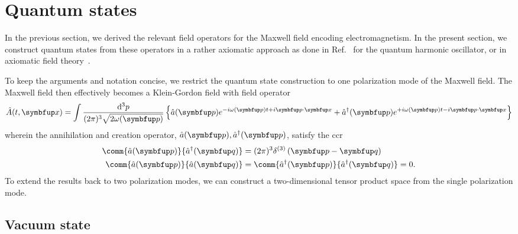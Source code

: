 \section{Quantum states}

In the previous section, we derived the relevant field operators for the Maxwell field encoding electromagnetism.
In the present section, we construct quantum states from these operators in a rather axiomatic approach as done in Ref.~\cite[p.~506]{Cohen2019} for the quantum harmonic oscillator, or in axiomatic field theory~\cite{Streater2016,Haag2012,Bogolubov1989}.

To keep the arguments and notation concise, we restrict the quantum state construction to one polarization mode of the Maxwell field.
The Maxwell field then effectively becomes a Klein-Gordon field with field operator
\begin{equation}
	\hat{A}(t,\vb{x})
	=
	\int\frac{\dd[3]{p}}{(2\pi)^3\sqrt{2\omega(\vb{p})}}
	\left\{
		\hat{a}(\vb{p})
		e^{-i\omega(\vb{p})t+i\vb{p}\vdot\vb{x}}
		+
		\hat{a}^\dagger(\vb{p})
		e^{+i\omega(\vb{p})t-i\vb{p}\vdot\vb{x}}
	\right\}
	\label{eq:klein_gordon_operator}
\end{equation}
wherein the annihilation and creation operator, $\hat{a}(\vb{p}),\hat{a}^\dagger(\vb{p})$, satisfy the \gls{ccr}
\begin{align}
	\comm{\hat{a}(\vb{p})}{\hat{a}^\dagger(\vb{q})}
	&=
	(2\pi)^3\delta^{(3)}
	\left(\vb{p}-\vb{q}\right)
	\\
	\comm{\hat{a}(\vb{p})}{\hat{a}(\vb{q})}
	&=
	\comm{\hat{a}^\dagger(\vb{p})}{\hat{a}^\dagger(\vb{q})}
	=
	0
	\label{eq:klein_gordon_canonical_commutation_relation}.
\end{align}
To extend the results back to two polarization modes, we can construct a two-dimensional tensor product space from the single polarization mode.

\subsection{Vacuum state}

